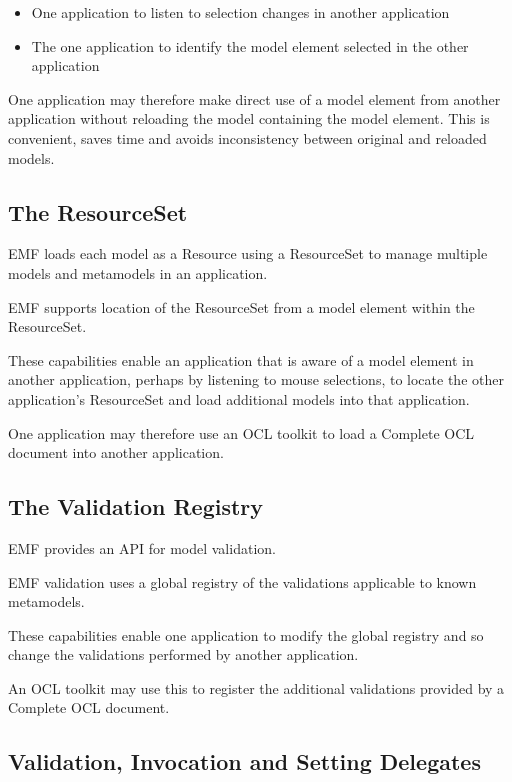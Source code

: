 \documentclass[a4paper]{article}
\begin{document}
\begin{itemize}
\item One application to listen to selection changes in another application
\item The one application to identify the model element selected in the other application
\end{itemize}

One application may therefore make direct use of a model element from another application without reloading the model containing the model element. This is convenient, saves time and avoids inconsistency between original and reloaded models.

\subsection{The ResourceSet}\label{ResourceSet}

EMF loads each model as a Resource using a ResourceSet to manage multiple models and metamodels in an application.

EMF supports location of the ResourceSet from a model element within the ResourceSet.

These capabilities enable an application that is aware of a model element in another application, perhaps by listening to mouse selections, to locate the other application's ResourceSet and load additional models into that application.

One application may therefore use an OCL toolkit to load a Complete OCL document into another application.

\subsection{The Validation Registry}

EMF provides an API for model validation.

EMF validation uses a global registry of the validations applicable to known metamodels.

These capabilities enable one application to modify the global registry and so change the validations performed by another application.

An OCL toolkit may use this to register the additional validations provided by a Complete OCL document.

\subsection{Validation, Invocation and Setting Delegates}
\end{document}
